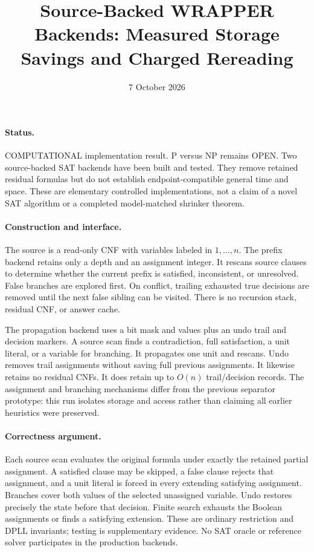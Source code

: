\documentclass[11pt]{article}
\title{Source-Backed WRAPPER Backends: Measured Storage Savings and Charged Rereading}
\date{7 October 2026}
\begin{document}
\maketitle
\paragraph{Status.} COMPUTATIONAL implementation result. P versus NP remains
OPEN. Two source-backed SAT backends have been built and tested. They remove
retained residual formulas but do not establish endpoint-compatible general
time and space. These are elementary controlled implementations, not a claim
of a novel SAT algorithm or a completed model-matched shrinker theorem.

\paragraph{Construction and interface.}
The source is a read-only CNF with variables labeled in $1,\ldots,n$.
The prefix backend retains only a depth and an assignment integer. It rescans
source clauses to determine whether the current prefix is satisfied, inconsistent,
or unresolved. False branches are explored first. On conflict, trailing exhausted
true decisions are removed until the next false sibling can be visited. There
is no recursion stack, residual CNF, or answer cache.

The propagation backend uses a bit mask and values plus an undo trail and
decision markers. A source scan finds a contradiction, full satisfaction, a unit
literal, or a variable for branching. It propagates one unit and rescans. Undo
removes trail assignments without saving full previous assignments. It likewise
retains no residual CNFs. It does retain up to $O(n)$ trail/decision records.
The assignment and branching mechanisms differ from the previous separator
prototype: this run isolates storage and access rather than claiming all earlier
heuristics were preserved.

\paragraph{Correctness argument.}
Each source scan evaluates the original formula under exactly the retained
partial assignment. A satisfied clause may be skipped, a false clause rejects
that assignment, and a unit literal is forced in every extending satisfying
assignment. Branches cover both values of the selected unassigned variable.
Undo restores precisely the state before that decision. Finite search exhausts
the Boolean assignments or finds a satisfying extension. These are ordinary
restriction and DPLL invariants; testing is supplementary evidence. No SAT
oracle or reference solver participates in the production backends.
\end{document}
